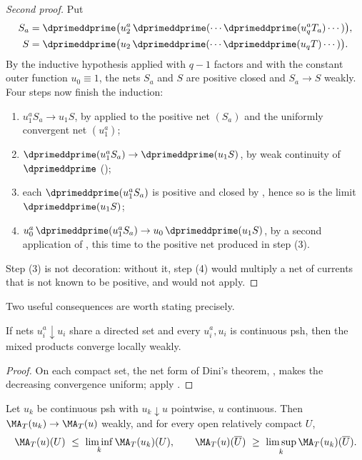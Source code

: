 \begin{proof}[Second proof]
Put
\[
\begin{gathered}
 S_a=\dprimeddprime\bigl(u_2^a\,\dprimeddprime(\cdots
   \dprimeddprime(u_q^aT_a)\cdots)\bigr),\\
 S=\dprimeddprime\bigl(u_2\,\dprimeddprime(\cdots
   \dprimeddprime(u_qT)\cdots)\bigr).
\end{gathered}
\]
By the inductive hypothesis applied with $q-1$ factors and with the constant
outer function $u_0\equiv1$, the nets $S_a$ and $S$ are positive closed and
$S_a\to S$ weakly.  Four steps now finish the induction:
\begin{enumerate}
\item $u_1^aS_a\to u_1S$, by
  applied to the positive net
 $(S_a)$ and the uniformly convergent net $(u_1^a)$;
\item $\dprimeddprime(u_1^aS_a)\to\dprimeddprime(u_1S)$, by weak continuity
 of $\dprimeddprime$ ();
\item each $\dprimeddprime(u_1^aS_a)$ is positive and closed by
 , hence so is the limit
 $\dprimeddprime(u_1S)$;
\item $u_0^a\,\dprimeddprime(u_1^aS_a)\to u_0\,\dprimeddprime(u_1S)$, by a
 second application of , this
 time to the positive net produced in step (3).
\end{enumerate}
Step (3) is not decoration: without it, step (4) would multiply a net of
currents that is not known to be positive, and
 would not apply.
\end{proof}

Two useful consequences are worth stating precisely.

\begin{corollary}
\label{cor:ch16-decreasing-nets}
If nets $u_i^a\downarrow u_i$ share a directed set and every $u_i^a,u_i$ is
continuous psh, then the mixed products converge locally weakly.
\end{corollary}
\begin{proof}
On each compact set, the net form of Dini's theorem,
, makes the decreasing convergence uniform; apply
.
\end{proof}

\begin{corollary}
\label{cor:ch16-monotone-ma}
Let $u_k$ be continuous psh with $u_k\downarrow u$ pointwise, $u$
continuous.  Then $\MA_T(u_k)\to\MA_T(u)$ weakly, and for every open
relatively compact $U$,
\[
 \MA_T(u)(U)\ \leq\ \liminf_k\MA_T(u_k)(U),
 \qquad
 \MA_T(u)(\overline U)\ \geq\ \limsup_k\MA_T(u_k)(\overline U).
\]
\end{corollary}

